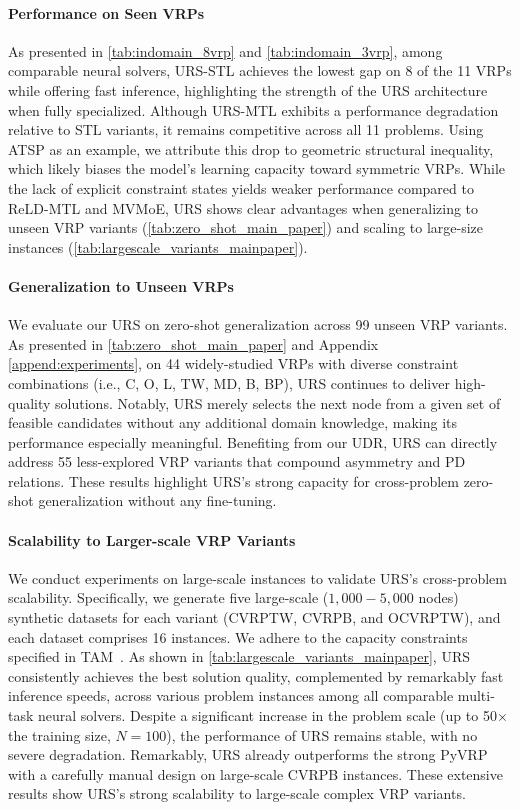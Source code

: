 \documentclass{article}
\theoremstyle{plain}
\theoremstyle{definition}
\theoremstyle{remark}
\begin{document}
\paragraph{Performance on Seen VRPs}
As presented in \cref{tab:indomain_8vrp} and \cref{tab:indomain_3vrp}, among comparable neural solvers, URS-STL achieves the lowest gap on 8 of the 11 VRPs while offering fast inference, highlighting the strength of the URS architecture when fully specialized. Although URS-MTL exhibits a performance degradation relative to STL variants, it remains competitive across all 11 problems. Using ATSP as an example, we attribute this drop to geometric structural inequality, which likely biases the model's learning capacity toward symmetric VRPs. While the lack of explicit constraint states yields weaker performance compared to ReLD-MTL and MVMoE, URS shows clear advantages when generalizing to unseen VRP variants (\cref{tab:zero_shot_main_paper}) and scaling to large-size instances (\cref{tab:largescale_variants_mainpaper}). 


\paragraph{Generalization to Unseen VRPs}
We evaluate our URS on zero-shot generalization across 99 unseen VRP variants. As presented in \cref{tab:zero_shot_main_paper} and Appendix \ref{append:experiments}, on 44 widely-studied VRPs with diverse constraint combinations (i.e., C, O, L, TW, MD, B, BP), URS continues to deliver high-quality solutions. Notably, URS merely selects the next node from a given set of feasible candidates without any additional domain knowledge, making its performance especially meaningful. Benefiting from our UDR, URS can directly address 55 less-explored VRP variants that compound asymmetry and PD relations. These results highlight URS's strong capacity for cross-problem zero-shot generalization without any fine-tuning.

\paragraph{Scalability to Larger-scale VRP Variants}
We conduct experiments on large-scale instances to validate URS's cross-problem scalability. Specifically, we generate five large-scale ($1,000-5,000$ nodes) synthetic datasets for each variant (CVRPTW, CVRPB, and OCVRPTW), and each dataset comprises 16 instances. We adhere to the capacity constraints specified in TAM~\citep{hou2022tam}. As shown in \cref{tab:largescale_variants_mainpaper}, URS consistently achieves the best solution quality, complemented by remarkably fast inference speeds, across various problem instances among all comparable multi-task neural solvers. Despite a significant increase in the problem scale (up to 50$\times$ the training size, $N=100$), the performance of URS remains stable, with no severe degradation. Remarkably, URS already outperforms the strong PyVRP with a carefully manual design on large-scale CVRPB instances. These extensive results show URS's strong scalability to large-scale complex VRP variants.
\end{document}
